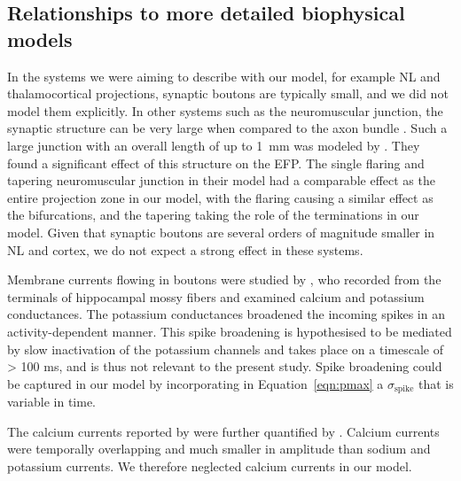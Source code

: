 \documentclass[]{elife}
\begin{document}
\subsection{Relationships to more detailed biophysical
models}\label{relationships-to-more-detailed-biophysical-models}

In the systems we were aiming to describe with our model, for example NL
and thalamocortical projections, synaptic boutons are typically small,
and we did not model them explicitly. In other systems such as the
neuromuscular junction, the synaptic structure can be very large when
compared to the axon bundle
\citep{Harris1979Relationship, Katz1961Terminations, Katz1965Propagation}.
Such a large junction with an overall length of up to 1~mm was modeled
by \citet{Gydikov1986Extracellular}. They found a significant effect of
this structure on the EFP. The single flaring and tapering neuromuscular
junction in their model had a comparable effect as the entire projection
zone in our model, with the flaring causing a similar effect as the
bifurcations, and the tapering taking the role of the terminations in
our model. Given that synaptic boutons are several orders of magnitude
smaller in NL and cortex, we do not expect a strong effect in these
systems.

Membrane currents flowing in boutons were studied by
\citet{Geiger2000Dynamic}, who recorded from the terminals of
hippocampal mossy fibers and examined calcium and potassium
conductances. The potassium conductances broadened the incoming spikes
in an activity-dependent manner. This spike broadening is hypothesised
to be mediated by slow inactivation of the potassium channels and takes
place on a timescale of \textgreater{} 100 ms, and is thus not relevant
to the present study. Spike broadening could be captured in our model by
incorporating in Equation~\ref{eqn:pmax} a
\(\sigma_\text{spike}\) that is variable in time.

The calcium currents reported by \citet{Geiger2000Dynamic} were further
quantified by \citet{Alle2009EnergyEfficient}. Calcium currents were
temporally overlapping and much smaller in amplitude than sodium and
potassium currents. We therefore neglected calcium currents in our
model.
\end{document}
